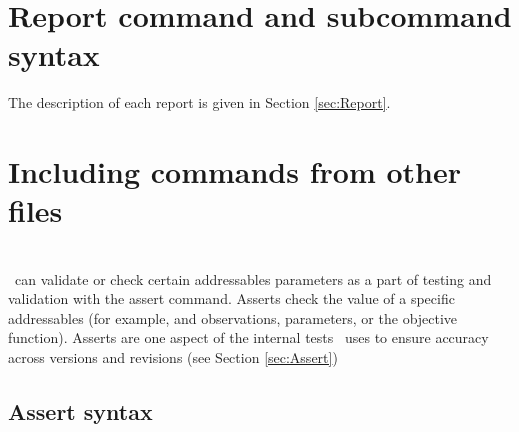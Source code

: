 \section{Report command and subcommand syntax\label{syntax:Reports}}

The description of each report is given in Section \ref{sec:Report}.

\subsection{}



\section{Including commands from other files\label{syntax:General}}



\section{}\label{syntax:Assert}

\CNAME\ can validate or check certain addressables parameters as a part of testing and validation with the assert command. Asserts check the value of a specific addressables (for example, and observations, parameters, or the objective function). Asserts are one aspect of the internal tests \CNAME\ uses to ensure accuracy across versions and revisions (see Section \ref{sec:Assert})

\subsection{Assert syntax}




